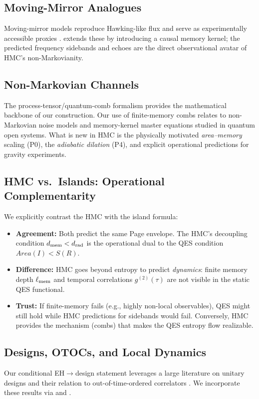 \documentclass[11pt,a4paper]{article}
\newcommand{\HMC}{\textsc{HMC}\xspace}
\theoremstyle{plain}
\theoremstyle{definition}
\theoremstyle{remark}
\begin{document}
\subsection{Moving-Mirror Analogues}
Moving-mirror models reproduce Hawking-like flux and serve as experimentally accessible proxies \cite{Davies:1976,GoodLinder:2017}.
 extends these by introducing a causal memory kernel; the predicted frequency sidebands and echoes
are the direct observational avatar of \HMC{}'s non-Markovianity.

\subsection{Non-Markovian Channels}
The process-tensor/quantum-comb formalism \cite{Chiribella:2009} provides the mathematical backbone of our construction.
Our use of finite-memory combs relates to non-Markovian noise models and memory-kernel master equations studied in quantum open systems.
What is new in \HMC{} is the physically motivated \emph{area--memory} scaling (P0), the \emph{adiabatic dilation} (P4), and explicit operational predictions for gravity experiments.

\subsection{HMC vs.\ Islands: Operational Complementarity}
We explicitly contrast the HMC with the island formula:
\begin{itemize}
    \item \textbf{Agreement:} Both predict the same Page envelope. The HMC's decoupling condition $d_{\rm mem} < d_{\rm rad}$ is the operational dual to the QES condition $Area(I) < S(R)$.
    \item \textbf{Difference:} HMC goes beyond entropy to predict \emph{dynamics}: finite memory depth $\ell_{\rm mem}$ and temporal correlations $g^{(2)}(\tau)$ are not visible in the static QES functional.
    \item \textbf{Trust:} If finite-memory fails (e.g., highly non-local observables), QES might still hold while HMC predictions for sidebands would fail. Conversely, HMC provides the mechanism (combs) that makes the QES entropy flow realizable.
\end{itemize}

\subsection{Designs, OTOCs, and Local Dynamics}
Our conditional EH$\to$design statement leverages a large literature on unitary designs
\cite{Dankert:2009,HarrowLow:2009,Brandao:2016,HunterJones:2019} and their relation to out-of-time-ordered correlators
\cite{RobertsYoshida:2017,Cotler:2017}.
We incorporate these results via  and .
\end{document}
